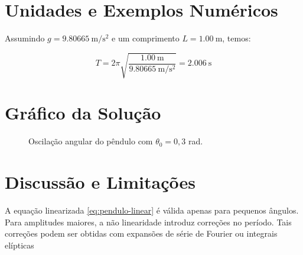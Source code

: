 \section{Unidades e Exemplos Numéricos}

Assumindo $g = \qty{9.80665}{\meter\per\square\second}$ e um comprimento $L = \qty{1.00}{\meter}$, temos:

\[T = 2\pi \sqrt{\frac{\qty{1.00}{\meter}}{\qty{9.80665}{\meter\per\square\second}}} = \qty{2.006}{\second} \]

\section{Gráfico da Solução}

\begin{figure}[h]
    \centering
    \caption{Oscilação angular do pêndulo com $\theta_0 = 0{,}3$ rad.}
\end{figure}

\section{Discussão e Limitações}

A equação linearizada \eqref{eq:pendulo-linear} é válida apenas para pequenos ângulos. Para amplitudes maiores, a não linearidade introduz correções no período. Tais correções podem ser obtidas com expansões de série de Fourier ou integrais elípticas %

